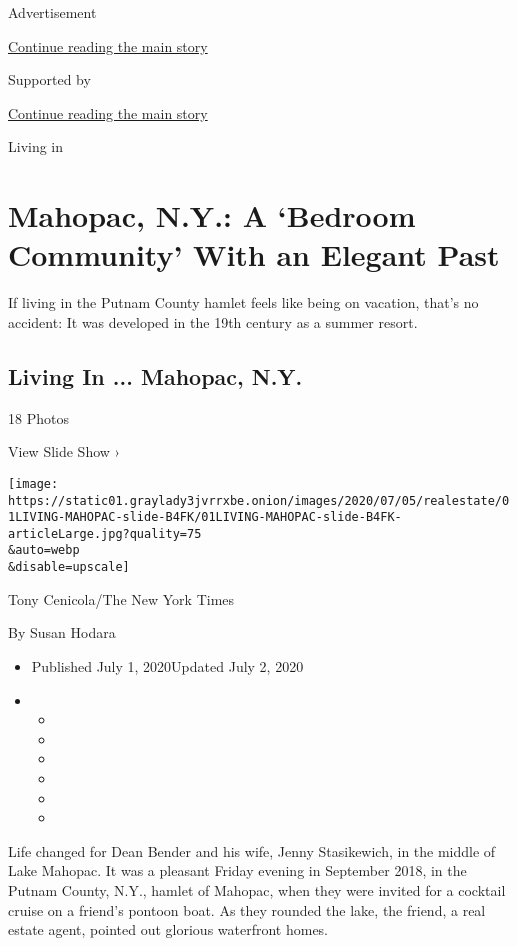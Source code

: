 Advertisement

\protect\hyperlink{after-top}{Continue reading the main story}

Supported by

\protect\hyperlink{after-sponsor}{Continue reading the main story}

Living in

\hypertarget{mahopac-ny-a-bedroom-community-with-an-elegant-past}{%
\section{Mahopac, N.Y.: A `Bedroom Community' With an Elegant
Past}\label{mahopac-ny-a-bedroom-community-with-an-elegant-past}}

If living in the Putnam County hamlet feels like being on vacation,
that's no accident: It was developed in the 19th century as a summer
resort.

\href{https://www.nytimes3xbfgragh.onion/slideshow/2020/07/01/realestate/living-in-mahopac-ny.html}{}

\hypertarget{living-in--mahopac-ny}{%
\subsection{Living In ... Mahopac, N.Y.}\label{living-in--mahopac-ny}}

18 Photos

View Slide Show ›

\texttt{[image: https://static01.graylady3jvrrxbe.onion/images/2020/07/05/realestate/01LIVING-MAHOPAC-slide-B4FK/01LIVING-MAHOPAC-slide-B4FK-articleLarge.jpg?quality=75\\\&auto=webp\\\&disable=upscale]}

Tony Cenicola/The New York Times

By Susan Hodara

\begin{itemize}
\item
  Published July 1, 2020Updated July 2, 2020
\item
  \begin{itemize}
  \item
  \item
  \item
  \item
  \item
  \item
  \end{itemize}
\end{itemize}

Life changed for Dean Bender and his wife, Jenny Stasikewich, in the
middle of Lake Mahopac. It was a pleasant Friday evening in September
2018, in the Putnam County, N.Y., hamlet of Mahopac, when they were
invited for a cocktail cruise on a friend's pontoon boat. As they
rounded the lake, the friend, a real estate agent, pointed out glorious
waterfront homes.

